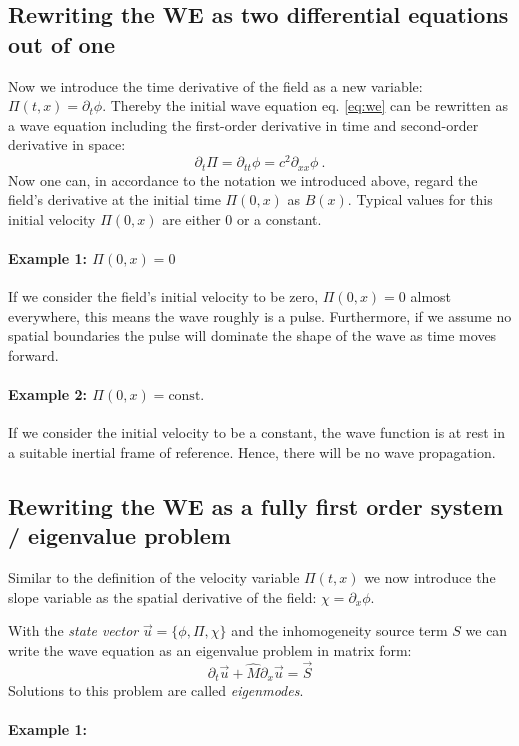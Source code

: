 \subsection{Rewriting the WE as two differential equations out of one}
Now we introduce the time derivative of the field as a new variable: $\Pi (t,x) = \partial_t \phi$. Thereby the initial wave equation eq. \ref{eq:we} can be rewritten as a wave equation including the first-order derivative in time and second-order derivative in space:
\begin{equation}
	\partial_t \Pi = \partial_{tt} \phi =  c^2 \partial_{xx}\phi ~.
\end{equation}
Now one can, in accordance to the notation we introduced above, regard the field's derivative at the initial time $\Pi(0,x)$ as $B(x)$.
Typical values for this initial velocity $\Pi (0,x)$ are either 0 or a constant.

\paragraph{Example 1: $\Pi(0,x) = 0$}
If we consider the field's initial velocity to be zero, $\Pi(0,x) = 0$ almost everywhere, this means the wave roughly is a pulse. Furthermore, if we assume no spatial boundaries the pulse will dominate the shape of the wave as time moves forward.
\paragraph{Example 2: $\Pi(0,x) = \text{const.}$}
If we consider the initial velocity to be a constant, the wave function is at rest in a suitable inertial frame of reference. Hence, there will be no wave propagation.



\subsection{Rewriting the WE as a fully first order system / eigenvalue problem}

Similar to the definition of the velocity variable $\Pi(t,x)$ we now introduce the slope variable as the spatial derivative of the field: $\chi = \partial_x \phi$.

With the \emph{state vector} $\vec{u} = \{ \phi, \Pi , \chi \}$ and the inhomogeneity source term $S$ we can write the wave equation as an eigenvalue problem in matrix form:
\begin{equation}
	\partial_t \vec{u} + \hat{M} \partial_x \vec{u} = \vec{S}
\end{equation}
Solutions to this problem are called \emph{eigenmodes}.


\paragraph{Example 1:}
